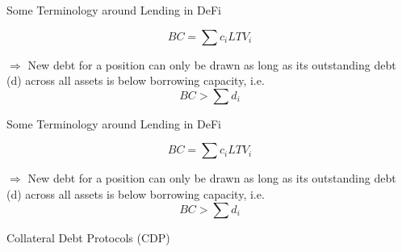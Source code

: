 \documentclass[handout]{beamer}
\begin{document}
\begin{frame}{Some Terminology around Lending in DeFi}

\vspace{1em}

	
	 {\begin{equation}
	  BC = \sum c_i LTV_i  \label{eq:BC} 
	\end{equation}}
	
$	\Rightarrow$ New debt for a position can only be drawn as long as its outstanding debt (d) across all assets is below borrowing capacity, i.e.
\begin{equation}
	  BC > \sum d_i\label{eq:BC_restriction} 
	\end{equation}

	\vspace{1em}

\end{frame}

\begin{frame}{Some Terminology around Lending in DeFi}

\vspace{1em}

	
	 {\begin{equation}
	  BC = \sum c_i LTV_i  \label{eq:BC} 
	\end{equation}}
	
$	\Rightarrow$ New debt for a position can only be drawn as long as its outstanding debt (d) across all assets is below borrowing capacity, i.e.
\begin{equation}
	  BC > \sum d_i\label{eq:BC_restriction} 
	\end{equation}
	
	\vspace{1em}

\end{frame}




\begin{frame}{Collateral Debt Protocols (CDP)}

	
\end{frame}
\end{document}
